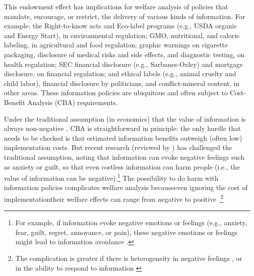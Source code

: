 
This endowment effect has implications for welfare analysis of policies that mandate, encourage, or restrict, the delivery of various kinds of information. For example: the Right-to-know acts and Eco-label programs (e.g., USDA organic and Energy Start), in environmental regulation; GMO, nutritional, and calorie labeling, in agricultural and food regulation; graphic warnings on cigarette packaging, disclosure of medical risks and side effects, and diagnostic testing, on health regulation; SEC financial disclosure (e.g., Sarbanes-Oxley) and mortgage disclosure, on financial regulation; and ethical labels (e.g., animal cruelty and child labor), financial disclosure by politicians, and conflict-mineral content, in other areas. These information policies are ubiquitous and often subject to Cost-Benefit Analysis (CBA) requirements.

Under the traditional assumption (in economics) that the value of information is always non-negative \citep{stiglerEconomicsInformation1961}, CBA is straightforward in principle: the only hurdle that needs to be checked is that estimated information benefits outweigh (often low) implementation costs. But recent research (reviewed by \citet{golmanInformationAvoidance2017}) has challenged the traditional assumption, noting that information can evoke negative feelings such as anxiety or guilt, so that even costless information can harm people (i.e., the value of information can be negative).\footnote{For example, if information evoke negative emotions or feelings (e.g., anxiety, fear, guilt, regret, annoyance, or pain), these negative emotions or feelings might lead to information avoidance \citep{koszegiHealthAnxietyPatient2003,danaExploitingMoralWiggle2007,karlssonOstrichEffectSelective2009,sweenyInformationAvoidanceWho2010,osterOptimalExpectationsLimited2013,grossmanStrategicIgnoranceRobustness2014,hertwigHomoIgnoransDeliberately2016,onwezenWhenIndifferenceAmbivalence2016,savolainenApproachingAffectiveBarriers2016,thunstromStrategicSelfignorance2016,grossmanSelfImageWillfulIgnorance2017,damgaardHiddenCostsNudging2018,thunstromEndogenousAttentionCosts2019,sunsteinRuiningPopcornWelfare2019}.} The possibility to do harm with information policies complicates welfare analysis because\textemdash even ignoring the cost of implementation\textemdash their welfare effects can range from negative to positive \citep{damgaardHiddenCostsNudging2018, allcottWelfareEffectsNudges2019,buteraDeadweightLossSocial2019,rafiqHowMuchCalorieundefined/ed,thunstromWelfareEffectsNudges2020}.\footnote{The complication is greater if there is heterogeneity in negative feelings \citep{sunsteinRuiningPopcornWelfare2019}, or in the ability to respond to information \citep{robertsNudgeProofDistributiveJustice2018}}

